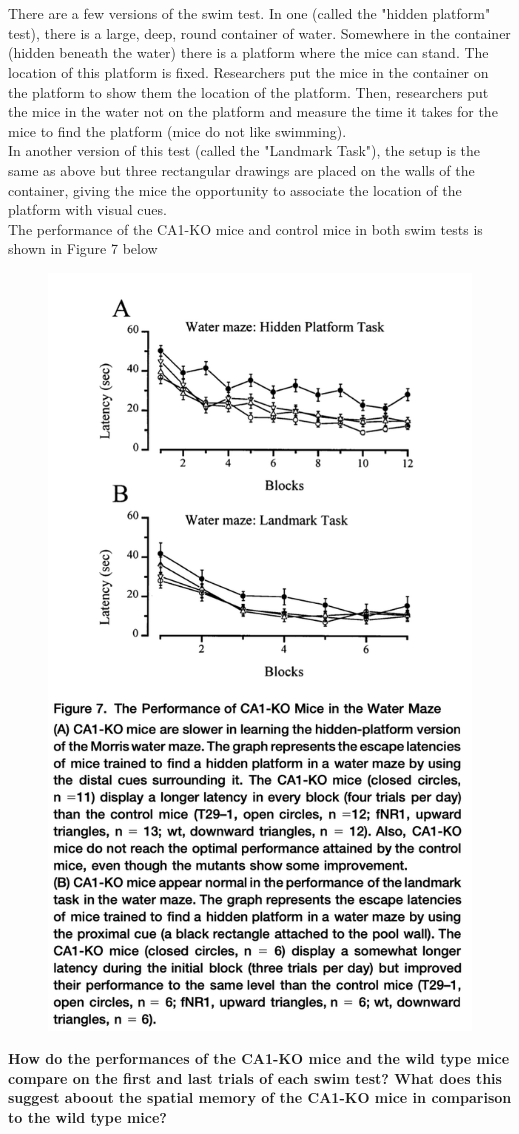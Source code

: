 \documentclass{article}
\begin{document}
\section{}
There are a few versions of the swim test. In one (called the "hidden platform" test), there is a large, deep, round container of water. Somewhere in the container (hidden beneath the water) there is a platform where the mice can stand. The location of this platform is fixed. Researchers put the mice in the container on the platform to show them the location of the platform. Then, researchers put the mice in the water not on the platform and measure the time it takes for the mice to find the platform (mice do not like swimming).\\
\indent In another version of this test (called the "Landmark Task"), the setup is the same as above but three rectangular drawings are placed on the walls of the container, giving the mice the opportunity to associate the location of the platform with visual cues.\\
\indent The performance of the CA1-KO mice and control mice in both swim tests is shown in Figure 7 below
\FloatBarrier
\begin{figure}[h]
  \centering
    \includegraphics[width=.5\textwidth]{fig7.png}
\end{figure}
\FloatBarrier

\noindent \textbf{How do the performances of the CA1-KO mice and the wild type mice compare on the first and last trials of each swim test? What does this suggest aboout the spatial memory of the CA1-KO mice in comparison to the wild type mice?}
\end{document}
